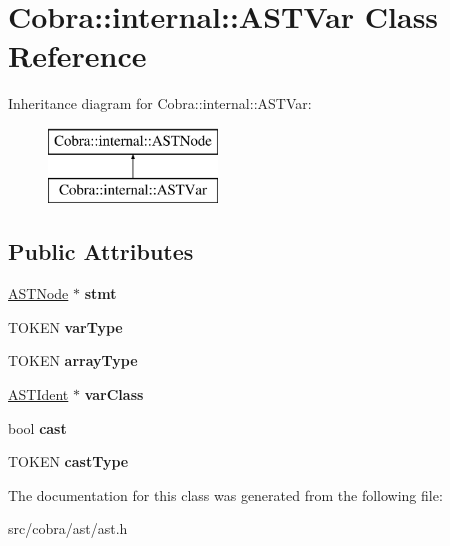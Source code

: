 \hypertarget{class_cobra_1_1internal_1_1_a_s_t_var}{\section{Cobra\+:\+:internal\+:\+:A\+S\+T\+Var Class Reference}
\label{class_cobra_1_1internal_1_1_a_s_t_var}
}
Inheritance diagram for Cobra\+:\+:internal\+:\+:A\+S\+T\+Var\+:\begin{figure}[H]
\begin{center}
\leavevmode
\includegraphics[height=2.000000cm]{class_cobra_1_1internal_1_1_a_s_t_var}
\end{center}
\end{figure}
\subsection*{Public Attributes}
\begin{DoxyCompactItemize}
\item 
\hypertarget{class_cobra_1_1internal_1_1_a_s_t_var_ae331fbe5e112d08352e5c47f26be5c32}{\hyperlink{class_cobra_1_1internal_1_1_a_s_t_node}{A\+S\+T\+Node} $\ast$ {\bfseries stmt}}\label{class_cobra_1_1internal_1_1_a_s_t_var_ae331fbe5e112d08352e5c47f26be5c32}

\item 
\hypertarget{class_cobra_1_1internal_1_1_a_s_t_var_a86c85537f17d498f5b0fcf15e22e76ad}{T\+O\+K\+E\+N {\bfseries var\+Type}}\label{class_cobra_1_1internal_1_1_a_s_t_var_a86c85537f17d498f5b0fcf15e22e76ad}

\item 
\hypertarget{class_cobra_1_1internal_1_1_a_s_t_var_a0e2e0adc76754328f4d85a8616daded2}{T\+O\+K\+E\+N {\bfseries array\+Type}}\label{class_cobra_1_1internal_1_1_a_s_t_var_a0e2e0adc76754328f4d85a8616daded2}

\item 
\hypertarget{class_cobra_1_1internal_1_1_a_s_t_var_a6a00a268063517fbe45c2a9700f2c117}{\hyperlink{class_cobra_1_1internal_1_1_a_s_t_ident}{A\+S\+T\+Ident} $\ast$ {\bfseries var\+Class}}\label{class_cobra_1_1internal_1_1_a_s_t_var_a6a00a268063517fbe45c2a9700f2c117}

\item 
\hypertarget{class_cobra_1_1internal_1_1_a_s_t_var_a7ac1d0995a7a118ca8e1b5851c87d1e1}{bool {\bfseries cast}}\label{class_cobra_1_1internal_1_1_a_s_t_var_a7ac1d0995a7a118ca8e1b5851c87d1e1}

\item 
\hypertarget{class_cobra_1_1internal_1_1_a_s_t_var_ad330198db949f75d27f99db886889b3a}{T\+O\+K\+E\+N {\bfseries cast\+Type}}\label{class_cobra_1_1internal_1_1_a_s_t_var_ad330198db949f75d27f99db886889b3a}

\end{DoxyCompactItemize}


The documentation for this class was generated from the following file\+:\begin{DoxyCompactItemize}
\item 
src/cobra/ast/ast.\+h\end{DoxyCompactItemize}
